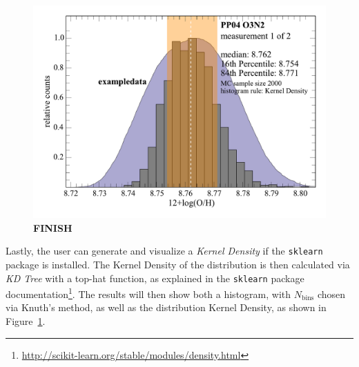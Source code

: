 \documentclass{emulateapj}
\begin{document}
\begin{figure}[ht!]
  \includegraphics[width=1.0\columnwidth]{exampledata_n2000_PP04_O3N2_1KDE.pdf}
   \caption{\textbf{FINISH}}
\label{fig:KDE}
\end{figure}
Lastly, the user can generate and visualize a \emph{Kernel Density} if the \verb=sklearn= package is installed. The Kernel Density of the distribution is then calculated via  \emph{KD Tree} with a top-hat function, as explained in the \verb=sklearn= package documentation\footnote{\url{http://scikit-learn.org/stable/modules/density.html}}. The results will then show both a histogram, with $N_\mathrm{bins}$ chosen via Knuth's method, as well as the distribution Kernel Density, as shown in Figure~\ref{fig:KDE}.
\end{document}
